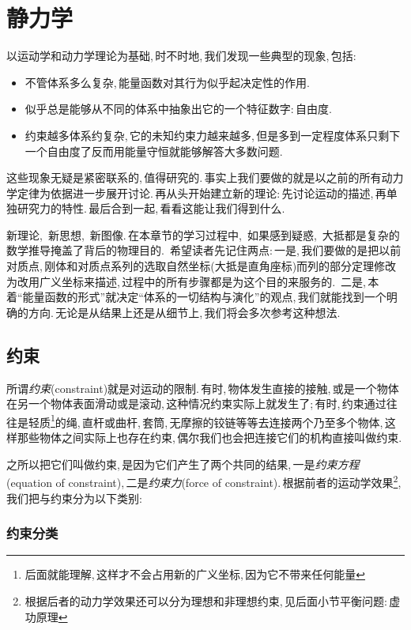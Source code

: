 \chapter{静力学}

以运动学和动力学理论为基础,\,时不时地,\,我们发现一些典型的现象,\,包括:
\begin{itemize}
  \item 不管体系多么复杂,\,能量函数对其行为似乎起决定性的作用.
  \item 似乎总是能够从不同的体系中抽象出它的一个特征数字:\,自由度.
  \item 约束越多体系约复杂,\,它的未知约束力越来越多,\,但是多到一定程度体系只剩下一个自由度了反而用能量守恒就能够解答大多数问题.
\end{itemize}

这些现象无疑是紧密联系的,\,值得研究的.\,事实上我们要做的就是以之前的所有动力学定律为依据进一步展开讨论.\,再从头开始建立新的理论:\,先讨论运动的描述,\,再单独研究力的特性.\,最后合到一起,\,看看这能让我们得到什么.

新理论,\, 新思想,\, 新图像.\,在本章节的学习过程中,\, 如果感到疑惑,\, 大抵都是复杂的数学推导掩盖了背后的物理目的.\, 希望读者先记住两点:\,一是,\,我们要做的是把以前对质点,\,刚体和对质点系列的选取自然坐标(大抵是直角座标)而列的部分定理修改为改用广义坐标来描述,\,过程中的所有步骤都是为这个目的来服务的.\, 二是,\,本着``能量函数的形式''就决定``体系的一切结构与演化''的观点,\,我们就能找到一个明确的方向.\,无论是从结果上还是从细节上,\,我们将会多次参考这种想法.

\section{约束}
所谓\emph{约束}(constraint)就是对运动的限制.\,有时,\,物体发生直接的接触,\,或是一个物体在另一个物体表面滑动或是滚动,\,这种情况约束实际上就发生了;\,有时,\,约束通过往往是轻质\footnote{后面就能理解,\,这样才不会占用新的广义坐标,\,因为它不带来任何能量}的绳,\,直杆或曲杆,\,套筒,\,无摩擦的铰链等等去连接两个乃至多个物体,\,这样那些物体之间实际上也存在约束,\,偶尔我们也会把连接它们的机构直接叫做约束.

之所以把它们叫做约束,\,是因为它们产生了两个共同的结果,\,一是\emph{约束方程}(equation of constraint),\,二是\emph{约束力}(force of constraint).\,根据前者的运动学效果\footnote{根据后者的动力学效果还可以分为理想和非理想约束,\,见后面小节平衡问题:\,虚功原理},\,我们把与约束分为以下类别:

\subsection{约束分类}

